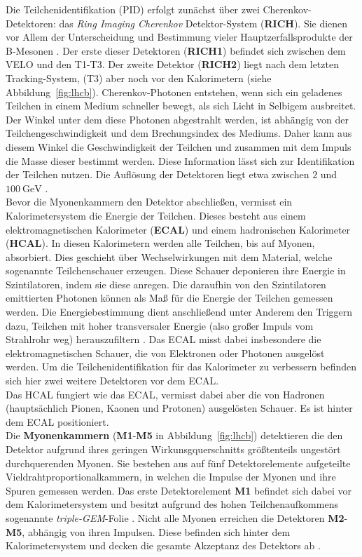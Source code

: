 Die Teilchenidentifikation (PID) erfolgt zunächst über zwei Cherenkov-Detektoren: das \textit{Ring Imaging Cherenkov} Detektor-System (\textbf{RICH}). Sie dienen vor Allem der Unterscheidung und Bestimmung vieler Hauptzerfallsprodukte der B-Mesonen \cite{lhcb}. Der erste dieser Detektoren (\textbf{RICH1}) befindet sich zwischen dem VELO und den T1-T3. Der zweite Detektor (\textbf{RICH2}) liegt nach dem letzten Tracking-System, (T3) aber noch vor den Kalorimetern (siehe Abbildung~\ref{fig:lhcb}). Cherenkov-Photonen entstehen, wenn sich ein geladenes Teilchen in einem Medium schneller bewegt, als sich Licht in Selbigem ausbreitet. Der Winkel unter dem diese Photonen abgestrahlt werden, ist abhängig von der Teilchengeschwindigkeit und dem Brechungsindex des Mediums. Daher kann aus diesem Winkel die Geschwindigkeit der Teilchen und zusammen mit dem Impuls die Masse dieser bestimmt werden. Diese Information lässt sich zur Identifikation der Teilchen nutzen. Die Auflösung der Detektoren liegt etwa zwischen $2$ und $\SI{100}{\giga\electronvolt}$ \cite{lhcb}.\\
%
Bevor die Myonenkammern den Detektor abschließen, vermisst ein Kalorimetersystem die Energie der Teilchen. Dieses besteht aus einem elektromagnetischen Kalorimeter (\textbf{ECAL}) und einem hadronischen Kalorimeter (\textbf{HCAL}). In  diesen Kalorimetern werden alle Teilchen, bis auf Myonen, absorbiert. Dies geschieht über Wechselwirkungen mit dem Material, welche sogenannte Teilchenschauer erzeugen. Diese Schauer deponieren ihre Energie in Szintilatoren, indem sie diese anregen. Die daraufhin von den Szintilatoren emittierten Photonen können als Maß für die Energie der Teilchen gemessen werden. Die Energiebestimmung dient anschließend unter Anderem den Triggern dazu, Teilchen mit hoher transversaler Energie (also großer Impuls vom Strahlrohr weg) herauszufiltern \cite{lhcb}. Das ECAL misst dabei insbesondere die elektromagnetischen Schauer, die von Elektronen oder Photonen ausgelöst werden. Um die Teilchenidentifikation für das Kalorimeter zu verbessern befinden sich hier zwei weitere Detektoren vor dem ECAL. \\
Das HCAL fungiert wie das ECAL, vermisst dabei aber die von Hadronen (hauptsächlich Pionen, Kaonen und Protonen) ausgelösten Schauer. Es ist hinter dem ECAL positioniert. \\
%
Die \textbf{Myonenkammern} (\textbf{M1}-\textbf{M5} in Abbildung~\ref{fig:lhcb}) detektieren die den Detektor aufgrund ihres geringen Wirkunsgquerschnitts größtenteils ungestört durchquerenden Myonen. Sie bestehen aus auf fünf Detektorelemente aufgeteilte Vieldrahtproportionalkammern, in welchen die Impulse der Myonen und ihre Spuren gemessen werden. Das erste Detektorelement \textbf{M1} befindet sich dabei vor dem Kalorimetersystem und besitzt aufgrund des hohen Teilchenaufkommens sogenannte \textit{triple-GEM}-Folie \cite{Tilburg}. Nicht alle Myonen erreichen die Detektoren \textbf{M2}-\textbf{M5}, abhängig von ihren Impulsen. Diese befinden sich hinter dem Kalorimetersystem und decken die gesamte Akzeptanz des Detektors ab \cite{lhcb}.

